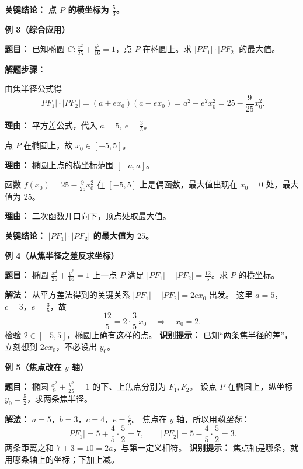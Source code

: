\begin{examplebox}
	\textbf{\textcolor{CExample}{关键结论：}}
	\textbf{点 $P$ 的横坐标为 $\displaystyle \frac{5}{3}$。}

	\medskip
	\textbf{\textcolor{CExample}{例 3（综合应用）}}

	\textbf{\textcolor{CExample}{题目：}}
	已知椭圆 $C: \frac{x^2}{25}+\frac{y^2}{16}=1$，点 $P$ 在椭圆上。求 $|PF_1|\cdot|PF_2|$ 的最大值。

	\textbf{\textcolor{CExample}{解题步骤：}}
	\begin{description}[style=nextline, leftmargin=2.8em, labelsep=0.5em, itemsep=0.45em]
		\item[\textbf{第一步（乘积表达）：}] 由焦半径公式得
			\[
				|PF_1|\cdot|PF_2| = (a+ex_0)(a-ex_0) = a^2 - e^2 x_0^2 = 25 - \frac{9}{25}x_0^2.
			\]
			\par\textbf{理由：} 平方差公式，代入 $a=5,\ e=\frac{3}{5}$。
		\item[\textbf{第二步（范围条件）：}] 点 $P$ 在椭圆上，故 $x_0\in[-5,5]$。
			\par\textbf{理由：} 椭圆上点的横坐标范围 $[-a,a]$。
		\item[\textbf{第三步（求最值）：}] 函数 $f(x_0)=25-\frac{9}{25}x_0^2$ 在 $[-5,5]$ 上是偶函数，最大值出现在 $x_0=0$ 处，最大值为 $25$。
			\par\textbf{理由：} 二次函数开口向下，顶点处取最大值。
	\end{description}

	\textbf{\textcolor{CExample}{关键结论：}}
	\textbf{$|PF_1|\cdot|PF_2|$ 的最大值为 $25$。}


\medskip
\textbf{\textcolor{CExample}{例 4（从焦半径之差反求坐标）}}

\textbf{\textcolor{CExample}{题目：}}
椭圆 $\frac{x^2}{25}+\frac{y^2}{16}=1$ 上一点 $P$ 满足
$|PF_1|-|PF_2|=\frac{12}{5}$。求 $P$ 的横坐标。

\textbf{\textcolor{CExample}{解法：}}
从平方差法得到的关键关系 $|PF_1|-|PF_2|=2ex_0$ 出发。
这里 $a=5$，$c=3$，$e=\frac35$，故
\[
 \frac{12}{5}=2\cdot\frac35\,x_0
 \quad\Longrightarrow\quad \boxed{x_0=2}.
\]
检验 $2\in[-5,5]$，椭圆上确有这样的点。
\textbf{识别提示：} 已知“两条焦半径的差”，立刻想到 $2ex_0$，不必设出 $y_0$。

\medskip
\textbf{\textcolor{CExample}{例 5（焦点改在 $y$ 轴）}}

\textbf{\textcolor{CExample}{题目：}}
椭圆 $\frac{x^2}{9}+\frac{y^2}{25}=1$ 的下、上焦点分别为 $F_1,F_2$。
设点 $P$ 在椭圆上，纵坐标 $y_0=\frac52$，求两条焦半径。

\textbf{\textcolor{CExample}{解法：}}
$a=5$，$b=3$，$c=4$，$e=\frac45$。
焦点在 $y$ 轴，所以用\emph{纵坐标}：
\[
 |PF_1|=5+\frac45\cdot\frac52=\boxed{7},\qquad
 |PF_2|=5-\frac45\cdot\frac52=\boxed{3}.
\]
两条距离之和 $7+3=10=2a$，与第一定义相符。
\textbf{识别提示：} 焦点轴是哪条，就用哪条轴上的坐标；下加上减。
\end{examplebox}
